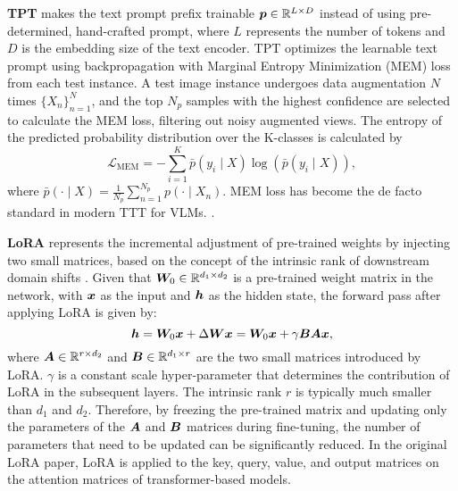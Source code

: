 \noindent\textbf{TPT} \citep{shu2022test} makes the text prompt prefix trainable ${\bm{p}} \in \mathbb{R}^{L \times D}$ instead of using pre-determined, hand-crafted prompt, where $L$ represents the number of tokens and $D$ is the embedding size of the text encoder.
TPT optimizes the learnable text prompt using backpropagation with Marginal Entropy Minimization (MEM) loss \citep{zhang2022memo} from each test instance.
A test image instance undergoes data augmentation $N$ times $\{X_n\}_{n=1}^{N}$, and the top $N_p$ samples with the highest confidence are selected to calculate the MEM loss, filtering out noisy augmented views.
The entropy of the predicted probability distribution over the K-classes is calculated by
\begin{equation}
\mathcal{L}_{\text{MEM}} = -\sum_{i=1}^{K} \bar{p}(y_i \mid X) \log(\bar{p}(y_i \mid X)),
\end{equation}
where
$\bar{p}(\cdot \mid X) = \frac{1}{N_p} \sum_{n=1}^{N_p} p(\cdot \mid X_n)$.
MEM loss has become the de facto standard in modern TTT for VLMs. \citep{farina2024frustratingly}.
\newline

\noindent\textbf{LoRA} \citep{hu2021lora} represents the incremental adjustment of pre-trained weights by injecting two small matrices, based on the concept of the intrinsic rank of downstream domain shifts \citep{aghajanyan2020intrinsic}.
Given that ${\bm{W}}_0 \in \mathbb{R}^{d_1 \times d_2}$ is a pre-trained weight matrix in the network, with ${\bm{x}}$ as the input and $\displaystyle {\bm{h}}$ as the hidden state, the forward pass after applying LoRA is given by:
\begin{equation}
\label{eq:lora}
{\bm{h}} = {\bm{W}}_0 {\bm{x}} + \Delta {\bm{W}} {\bm{x}} =  {\bm{W}}_0 {\bm{x}} + \gamma{\bm{B}}{\bm{A}}{\bm{x}},
\end{equation}
where ${\bm{A}} \in \mathbb{R}^{r \times d_2}$ and ${\bm{B}} \in \mathbb{R}^{d_1 \times r}$ are the two small matrices introduced by LoRA.
$\gamma$ is a constant scale hyper-parameter that determines the contribution of LoRA in the subsequent layers. The intrinsic rank $r$ is typically much smaller than $d_1$ and $d_2$. Therefore, by freezing the pre-trained matrix and updating only the parameters of the ${\bm{A}}$ and ${\bm{B}}$ matrices during fine-tuning, the number of parameters that need to be updated can be significantly reduced. In the original LoRA paper, LoRA is applied to the key, query, value, and output matrices on the attention matrices of transformer-based models. 

